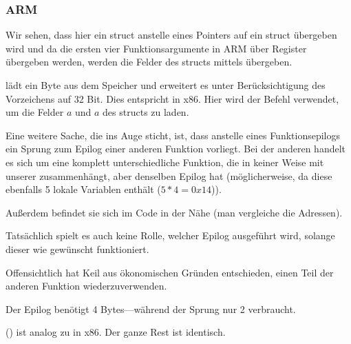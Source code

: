 \subsubsection{ARM}

\myparagraph{\OptimizingKeilVI (\ThumbMode)}


Wir sehen, dass hier ein struct anstelle eines Pointers auf ein struct übergeben wird und da die ersten vier
Funktionsargumente in ARM über Register übergeben werden, werden die Felder des structs mittels  übergeben.

 lädt ein Byte aus dem Speicher und erweitert es unter Berücksichtigung des Vorzeichens auf 32 Bit.
Dies entspricht \MOVSX in x86. 
Hier wird der Befehl verwendet, um die Felder $a$ und $a$ des structs zu laden.

Eine weitere Sache, die ins Auge sticht, ist, dass anstelle eines Funktionsepilogs ein Sprung zum Epilog einer anderen
Funktion vorliegt.
Bei der anderen handelt es sich um eine komplett unterschiedliche Funktion, die in keiner Weise mit unserer
zusammenhängt, aber denselben Epilog hat (möglicherweise, da diese ebenfalls 5 lokale Variablen enthält ($5*4=0x14$)).

Außerdem befindet sie sich im Code in der Nähe (man vergleiche die Adressen).

Tatsächlich spielt es auch keine Rolle, welcher Epilog ausgeführt wird, solange dieser wie gewünscht funktioniert.

Offensichtlich hat Keil aus ökonomischen Gründen entschieden, einen Teil der anderen Funktion wiederzuverwenden.

Der Epilog benötigt 4 Bytes---während der Sprung nur 2 verbraucht.




 () ist analog zu \MOVSX in x86.
Der ganze Rest ist identisch.

